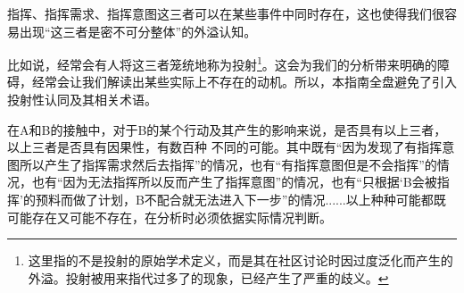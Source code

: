 指挥、指挥需求、指挥意图这三者可以在某些事件中同时存在，这也使得我们很容易出现“这三者是密不可分整体”的外溢认知。
\begin{explain}
比如说，经常会有人将这三者笼统地称为投射\footnote{这里指的不是投射的原始学术定义，而是其在社区讨论时因过度泛化而产生的外溢。投射被用来指代过多了的现象，已经产生了严重的歧义。}。这会为我们的分析带来明确的障碍，经常会让我们解读出某些实际上不存在的动机。所以，本指南全盘避免了引入投射性认同及其相关术语。

在A和B的接触中，对于B的某个行动及其产生的影响来说，是否具有以上三者，以上三者是否具有因果性，有数百种%
不同的可能。其中既有“因为发现了有指挥意图所以产生了指挥需求然后去指挥”的情况，也有“有指挥意图但是不会指挥”的情况，也有“因为无法指挥所以反而产生了指挥意图”的情况，也有“只根据‘B会被指挥’的预料而做了计划，B不配合就无法进入下一步”的情况......以上种种可能都既可能存在又可能不存在，在分析时必须依据实际情况判断。
\end{explain}

